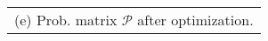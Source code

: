 \scriptsize
\begin{tabular}[t]{l}
	(e) Prob. matrix {$\mathcal{P}$} after optimization.
\end{tabular}